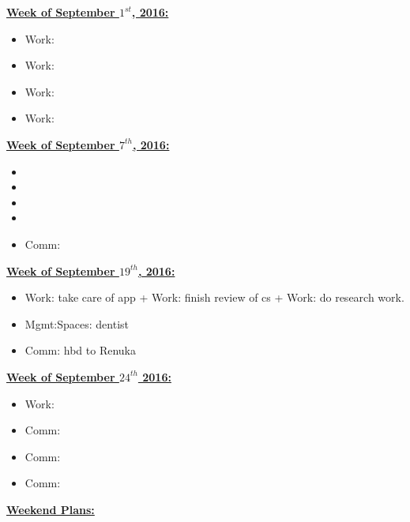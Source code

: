 \documentclass[serif, mathserif, final]{beamer}
\newcommand{\te}[1]{\textit{TimeEst:}\textit{#1}}
\newcommand{\dl}[1]{\textit{Deadline:}\textit{#1}}
\begin{document}
\begin{frame}
\begin{columns}
\begin{column}{0.5\textwidth}
\begin{block}{} 
{\underline{\textbf{Week of September $1^{st}$, 2016:}}}
\begin{itemize} 
\tiny \item \tiny Work: 
\item \tiny Work:
\item \tiny Work:
\item \tiny Work:
\end{itemize}
{\underline{\textbf{Week of September $7^{th}$, 2016:}}}
\begin{itemize} 
\tiny \item \tiny
\item \tiny 
\item \tiny 
\item \tiny 
\item \tiny Comm:
\end{itemize} 
{\underline{\textbf{Week of September $19^{th}$, 2016:}}}
\begin{itemize} 
\tiny \item \tiny Work: take care of app +  Work: finish review of cs
+ Work: do research work. 
\item \tiny Mgmt:Spaces: dentist 
\item \tiny Comm: hbd to Renuka  
\end{itemize}
{\underline{\textbf{Week of September $24^{th}$ 2016:}}}
\begin{itemize}
\tiny \item \tiny Work: 
\item \tiny Comm: 
\item \tiny Comm: 
\item \tiny Comm: 
\end{itemize}
{\underline{\textbf{Weekend Plans:}}}
\end{block}

\end{column} %
\end{columns}

\end{frame}
\end{document}
